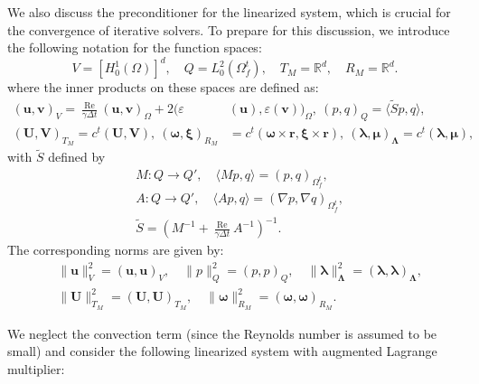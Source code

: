 \documentclass{article}
\newcommand{\bU}{{\mathbf{U}}}
\newcommand{\bu}{{\mathbf{u}}}
\newcommand{\bv}{{\mathbf{v}}}
\newcommand{\Reynolds}{{\operatorname{Re}}}
\begin{document}
We also discuss the preconditioner for the linearized system, which is crucial for the convergence of iterative solvers. To prepare for this discussion, we introduce the following notation for the function spaces:
\begin{equation}
    V = [H_0^1(\Omega)]^d, \quad
    Q = L^2_0(\Omega_f^t), \quad
    T_M = \mathbb{R}^d, \quad
    R_M = \mathbb{R}^d.
\end{equation}
where the inner products on these spaces are defined as:
\begin{equation}
    \begin{aligned}
        (\bu, \bv)_V = \frac{\Reynolds}{\gamma\Delta t}(\bu, \bv)_\Omega + 2(\varepsilon&(\bu), \varepsilon(\bv))_\Omega,~ 
        (p, q)_Q = \langle \tilde{S} p, q \rangle, \\
        (\bU, \mathbf{V})_{T_M} = c^t(\bU, \mathbf{V}), ~
        (\boldsymbol{\omega}, \boldsymbol{\xi})_{R_M} &= c^t(\boldsymbol{\omega} \times \mathbf{r}, \boldsymbol{\xi} \times \mathbf{r}), ~
        (\boldsymbol{\lambda}, \boldsymbol{\mu})_{\boldsymbol{\Lambda}} = c^t(\boldsymbol{\lambda}, \boldsymbol{\mu}),
    \end{aligned}
\end{equation}
with $\tilde{S}$ defined by 
\begin{equation}\label{eq:tildeS}
    \begin{aligned}
        &M: Q \to Q', \quad \langle Mp, q \rangle = (p, q)_{\Omega_f^t}, \\
        &A: Q \to Q', \quad \langle Ap, q \rangle = (\nabla p, \nabla q)_{\Omega_f^t}, \\
        &\tilde{S} = (M^{-1} + \frac{\Reynolds}{\gamma\Delta t} A^{-1})^{-1}.
    \end{aligned}
\end{equation}
The corresponding norms are given by:
\begin{equation}
    \begin{aligned}
        &\|\bu\|_V^2 = (\bu, \bu)_V, \quad
        \|p\|_Q^2 = (p, p)_Q, \quad
        \|\boldsymbol{\lambda}\|_{\boldsymbol{\Lambda}}^2 = (\boldsymbol{\lambda}, \boldsymbol{\lambda})_{\boldsymbol{\Lambda}}, \\
        &\|\bU\|_{T_M}^2 = (\bU, \bU)_{T_M}, \quad
        \|\boldsymbol{\omega}\|_{R_M}^2 = (\boldsymbol{\omega}, \boldsymbol{\omega})_{R_M}.
    \end{aligned}
\end{equation}

We neglect the convection term (since the Reynolds number is assumed to be small) and consider the following linearized system with augmented Lagrange multiplier:
\end{document}
